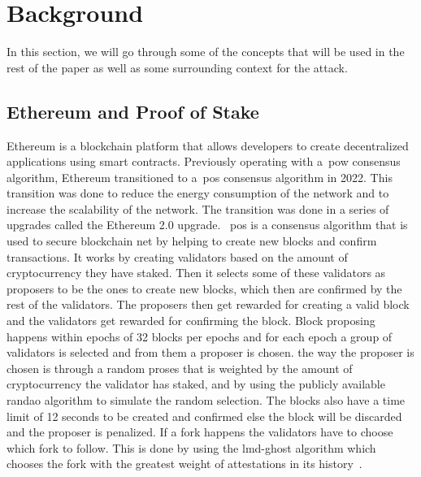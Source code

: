 
\section{Background}\label{sec:background}
In this section, we will go through some of the concepts that will be used in the rest of the paper as well as some surrounding context for the attack.

\subsection{Ethereum and Proof of Stake}\label{subsec:ethereum-and-proof-of-stake}
Ethereum is a blockchain platform that allows developers to create decentralized applications using smart contracts.
Previously operating with a~\gls{pow} consensus algorithm, Ethereum transitioned to a~\gls{pos} consensus algorithm in 2022.
This transition was done to reduce the energy consumption of the network and to increase the scalability of the network.
The transition was done in a series of upgrades called the Ethereum 2.0 upgrade.
~\gls{pos} is a consensus algorithm that is used to secure blockchain net by helping to create new blocks and confirm transactions.
It works by creating validators based on the amount of cryptocurrency they have staked.
Then it selects some of these validators as proposers to be the ones to create new blocks, which then are confirmed by the rest of the validators.
The proposers then get rewarded for creating a valid block and the validators get rewarded for confirming the block.
Block proposing happens within epochs of 32 blocks per epochs and for each epoch a group of validators is selected and from them a proposer is chosen.
the way the proposer is chosen is through a random proses that is weighted by the amount of cryptocurrency the validator has staked, and by using the publicly available \gls{randao} algorithm to simulate the random selection.
The blocks also have a time limit of 12 seconds to be created and confirmed else the block will be discarded and the proposer is penalized.
If a fork happens the validators have to choose which fork to follow.
This is done by using the \gls{lmd-ghost} algorithm which chooses the fork with the greatest weight of attestations in its history~\cite{EthereumProof-of-stakePoS}.

